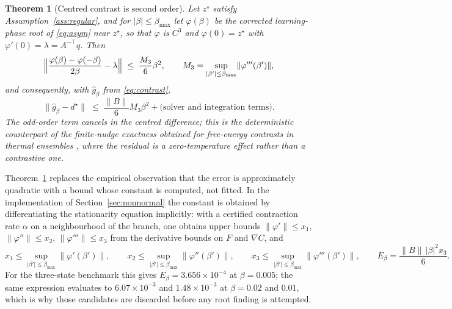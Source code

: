 \documentclass[11pt]{article}
\newtheorem{theorem}{Theorem}
\theoremstyle{definition}
\theoremstyle{remark}
\newcommand{\norm}[1]{\lVert #1 \rVert}
\newcommand{\abs}[1]{\lvert #1 \rvert}
\newcommand{\grad}{\nabla}
\newcommand{\betamax}{\beta_{\max}}
\begin{document}
\begin{theorem}[Centred contrast is second order]\label{thm:secondorder}
Let $z^\star$ satisfy Assumption~\ref{ass:regular}, and for $\abs{\beta} \le \betamax$ let
$\varphi(\beta)$ be the corrected learning-phase root of \eqref{eq:asym} near $z^\star$, so that
$\varphi$ is $C^3$ and $\varphi(0) = z^\star$ with
$\varphi'(0) = \lambda = A^{-\top}q$. Then
\begin{equation}
\Bigl\lVert \frac{\varphi(\beta) - \varphi(-\beta)}{2\beta} - \lambda \Bigr\rVert
\;\le\; \frac{M_3}{6}\beta^2,
\qquad
M_3 = \sup_{\abs{\beta'} \le \betamax} \lVert \varphi'''(\beta') \rVert ,
\label{eq:secondorder}
\end{equation}
and consequently, with $\widehat g_\beta$ from \eqref{eq:contrast},
\begin{equation}
\norm{\widehat g_\beta - d^\star} \;\le\; \frac{\norm{B}}{6} M_3 \beta^2 + \text{(solver and integration terms)} .
\label{eq:secondorder-grad}
\end{equation}
The odd-order term cancels in the centred difference; this is the deterministic counterpart of the
finite-nudge exactness obtained for free-energy contrasts in thermal ensembles
\cite{litman2026}, where the residual is a zero-temperature effect rather than a contrastive one.
\end{theorem}

Theorem~\ref{thm:secondorder} replaces the empirical observation that the error is approximately quadratic with a
bound whose constant is computed, not fitted. In the implementation of
Section~\ref{sec:nonnormal} the constant is obtained by differentiating the stationarity equation
implicitly: with a certified contraction rate $\alpha$ on a neighbourhood of the branch, one
obtains upper bounds $\lVert \varphi'\rVert \le x_1$, $\lVert \varphi''\rVert \le x_2$,
$\lVert \varphi'''\rVert \le x_3$ from the derivative bounds on $F$ and $\grad C$, and
\begin{equation}
x_1 \le \sup_{\abs{\beta'}\le\betamax}\norm{\varphi'(\beta')}, \qquad
x_2 \le \sup_{\abs{\beta'}\le\betamax}\norm{\varphi''(\beta')}, \qquad
x_3 \le \sup_{\abs{\beta'}\le\betamax}\norm{\varphi'''(\beta')},
\qquad
E_\beta = \frac{\norm{B}\,\abs{\beta}^2 x_3}{6}.
\label{eq:Ebeta}
\end{equation}
For the three-state benchmark this gives $E_\beta = 3.656\times10^{-4}$ at $\beta = 0.005$; the
same expression evaluates to $6.07\times10^{-3}$ and $1.48\times10^{-3}$ at $\beta = 0.02$ and
$0.01$, which is why those candidates are discarded before any root finding is attempted.
\end{document}
